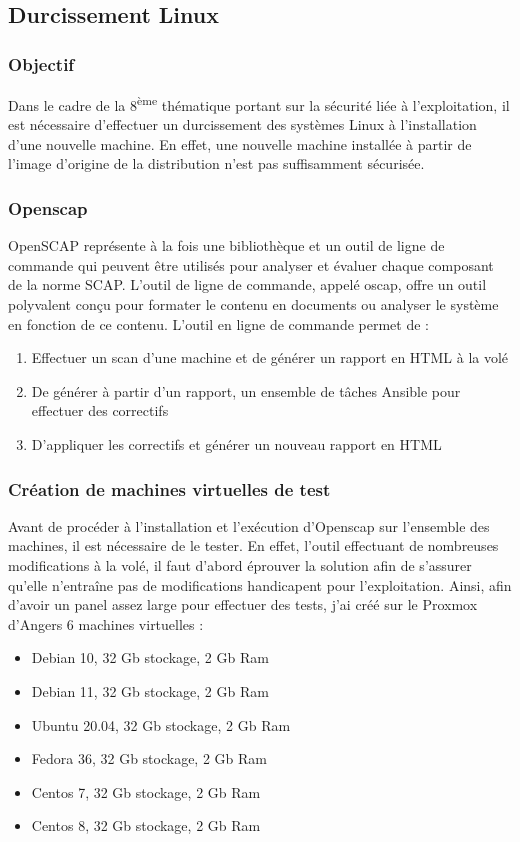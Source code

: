 \documentclass[12pt]{article}
\begin{document}
\newpage
\subsection{Durcissement Linux}
\subsubsection{Objectif}
Dans le cadre de la 8\textsuperscript{ème} thématique portant sur la sécurité liée à l'exploitation, il est nécessaire d'effectuer un durcissement des systèmes Linux à l'installation d'une nouvelle machine. En effet, une nouvelle machine installée à partir de l'image d'origine de la distribution n'est pas suffisamment sécurisée.

\subsubsection{Openscap}
OpenSCAP représente à la fois une bibliothèque et un outil de ligne de commande qui peuvent être utilisés pour analyser et évaluer chaque composant de la norme SCAP. L'outil de ligne de commande, appelé oscap, offre un outil polyvalent conçu pour formater le contenu en documents ou analyser le système en fonction de ce contenu. L'outil en ligne de commande permet de :
\begin{enumerate}
    \item Effectuer un scan d'une machine et de générer un rapport en HTML à la volé
    \item De générer à partir d'un rapport, un ensemble de tâches Ansible pour effectuer des correctifs
    \item D'appliquer les correctifs et générer un nouveau rapport en HTML
\end{enumerate}

\subsubsection{Création de machines virtuelles de test}
Avant de procéder à l'installation et l'exécution d'Openscap sur l'ensemble des machines, il est nécessaire de le tester. En effet, l'outil effectuant de nombreuses modifications à la volé, il faut d'abord éprouver la solution afin de s'assurer qu'elle n'entraîne pas de modifications handicapent pour l'exploitation.
Ainsi, afin d'avoir un panel assez large pour effectuer des tests, j'ai créé sur le Proxmox d'Angers 6 machines virtuelles :
\begin{itemize}
    \item Debian 10, 32 Gb stockage, 2 Gb Ram
    \item Debian 11, 32 Gb stockage, 2 Gb Ram
    \item Ubuntu 20.04, 32 Gb stockage, 2 Gb Ram
    \item Fedora 36, 32 Gb stockage, 2 Gb Ram
    \item Centos 7, 32 Gb stockage, 2 Gb Ram
    \item Centos 8, 32 Gb stockage, 2 Gb Ram
\end{itemize}
\end{document}

